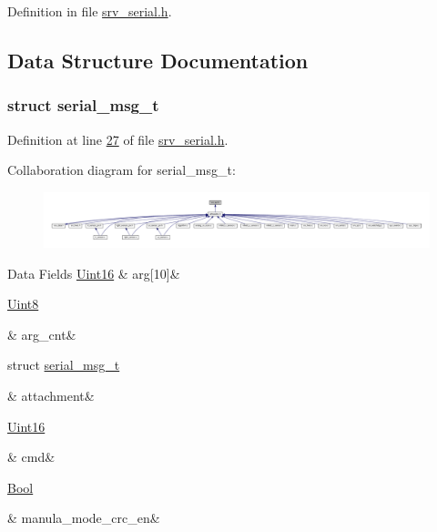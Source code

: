 Definition in file \hyperlink{a00031_source}{srv\+\_\+serial.\+h}.



\subsection{Data Structure Documentation}
\label{d3/d4f/a00761}
\hypertarget{a00031_d3/d4f/a00761}{}
\subsubsection{struct serial\+\_\+msg\+\_\+t}


Definition at line \hyperlink{a00031_source_l00027}{27} of file \hyperlink{a00031_source}{srv\+\_\+serial.\+h}.



Collaboration diagram for serial\+\_\+msg\+\_\+t\+:\nopagebreak
\begin{figure}[H]
\begin{center}
\leavevmode
\includegraphics[width=350pt]{da/dc4/a01692}
\end{center}
\end{figure}
\begin{DoxyFields}{Data Fields}
\hypertarget{a00031_af7d6f762438c80072bd9dc0e4dd4ae1e}{\hyperlink{a00072_a59a9f6be4562c327cbfb4f7e8e18f08b}{Uint16}}\label{a00031_af7d6f762438c80072bd9dc0e4dd4ae1e}
&
arg\mbox{[}10\mbox{]}&
\\
\hline

\hypertarget{a00031_a7b79f40e2eeec288091afd340bf8f591}{\hyperlink{a00072_af84840501dec18061d18a68c162a8fa2}{Uint8}}\label{a00031_a7b79f40e2eeec288091afd340bf8f591}
&
arg\+\_\+cnt&
\\
\hline

\hypertarget{a00031_a040f6d5d58d18d8aeaf447eda7f50172}{struct \hyperlink{a00031_df/d5f/a00762}{serial\+\_\+msg\+\_\+t}}\label{a00031_a040f6d5d58d18d8aeaf447eda7f50172}
&
attachment&
\\
\hline

\hypertarget{a00031_a13c351e37c82b2434e5ce4421012ffd6}{\hyperlink{a00072_a59a9f6be4562c327cbfb4f7e8e18f08b}{Uint16}}\label{a00031_a13c351e37c82b2434e5ce4421012ffd6}
&
cmd&
\\
\hline

\hypertarget{a00031_ac93426bd9983c1934abcbeddbb64e306}{\hyperlink{a00072_a253b248072cfc8bd812c69acd0046eed}{Bool}}\label{a00031_ac93426bd9983c1934abcbeddbb64e306}
&
manula\+\_\+mode\+\_\+crc\+\_\+en&
\\
\hline

\end{DoxyFields}
\label{df/d5f/a00762}
\hypertarget{a00031_df/d5f/a00762}{}
